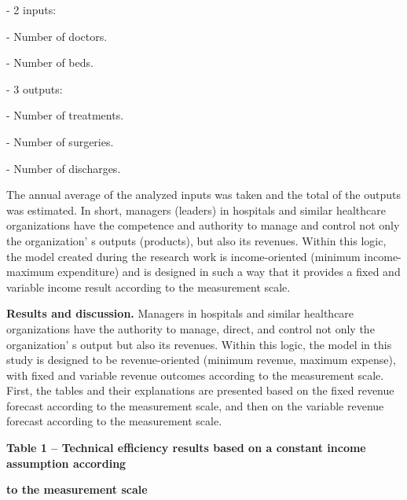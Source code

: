 - 2 inputs:

- Number of doctors.

- Number of beds.

- 3 outputs:

- Number of treatments.

- Number of surgeries.

- Number of discharges.

The annual average of the analyzed inputs was taken and the total of the
outputs was estimated. In short, managers (leaders) in hospitals and
similar healthcare organizations have the competence and authority to
manage and control not only the organization' s outputs
(products), but also its revenues. Within this logic, the model created
during the research work is income-oriented (minimum income-maximum
expenditure) and is designed in such a way that it provides a fixed and
variable income result according to the measurement scale.

{\bfseries Results and discussion.} Managers in hospitals and similar
healthcare organizations have the authority to manage, direct, and
control not only the organization' s output but also its
revenues. Within this logic, the model in this study is designed to be
revenue-oriented (minimum revenue, maximum expense), with fixed and
variable revenue outcomes according to the measurement scale. First, the
tables and their explanations are presented based on the fixed revenue
forecast according to the measurement scale, and then on the variable
revenue forecast according to the measurement scale.

{\bfseries Table 1 -- Technical efficiency results based on a constant
income assumption according}

{\bfseries to the measurement scale}

